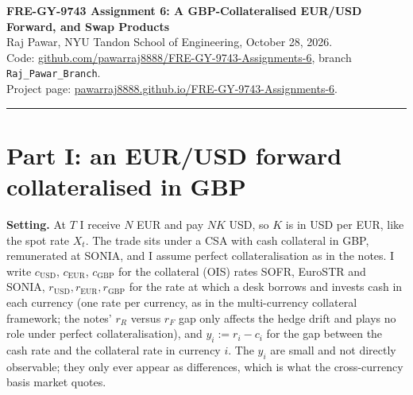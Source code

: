 \documentclass[10pt]{article}
\newcommand{\code}[1]{\texttt{#1}}
\newcommand{\usd}{\mathrm{USD}}\newcommand{\eur}{\mathrm{EUR}}\newcommand{\gbp}{\mathrm{GBP}}
\begin{document}
{\Large\bfseries FRE-GY-9743 Assignment 6: A GBP-Collateralised EUR/USD Forward, and Swap Products}\\[1pt]
Raj Pawar, NYU Tandon School of Engineering, October 28, 2026.\\
Code: \href{https://github.com/pawarraj8888/FRE-GY-9743-Assignments-6/tree/Raj_Pawar_Branch}{github.com/pawarraj8888/FRE-GY-9743-Assignments-6}, branch \code{Raj\_Pawar\_Branch}.\\
Project page: \href{https://pawarraj8888.github.io/FRE-GY-9743-Assignments-6/}{pawarraj8888.github.io/FRE-GY-9743-Assignments-6}.
\vspace{2pt}\hrule

\section*{Part I: an EUR/USD forward collateralised in GBP}
\textbf{Setting.} At $T$ I receive $N$ EUR and pay $NK$ USD, so $K$ is in USD per EUR, like the spot rate $X_t$. The trade
sits under a CSA with cash collateral in GBP, remunerated at SONIA, and I assume perfect collateralisation as in the notes.
I write $c_{\usd}$, $c_{\eur}$, $c_{\gbp}$ for the collateral (OIS) rates SOFR, EuroSTR and SONIA, $r_{\usd}, r_{\eur},
r_{\gbp}$ for the rate at which a desk borrows and invests cash in each currency (one rate per currency, as in the multi-currency collateral
framework; the notes' $r_R$ versus $r_F$ gap only affects the hedge drift and plays no role under perfect collateralisation), and $y_i := r_i - c_i$ for the gap between the cash rate and the collateral
rate in currency $i$. The $y_i$ are small and not directly observable; they only ever
appear as differences, which is what the cross-currency basis market quotes.
\end{document}
